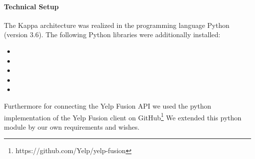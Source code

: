 \paragraph{Technical Setup}
\label{par:setup}
The Kappa architecture was realized in the programming language Python (version 3.6).
The following Python libraries were additionally installed:

\begin{itemize}
  \item {}
  \item {}
  \item {}
  \item {}
  \item {}
\end{itemize}

Furthermore for connecting the Yelp Fusion \ac{API} we used the python implementation of the Yelp Fusion client on GitHub\footnote{https://github.com/Yelp/yelp-fusion}
We extended this python module by our own requirements and wishes.
